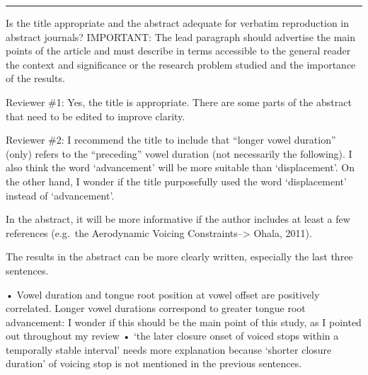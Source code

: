 \documentclass[]{article}
\begin{document}
\rule{\textwidth}{0.4pt}

Is the title appropriate and the abstract adequate for verbatim
reproduction in abstract journals? IMPORTANT: The lead paragraph should
advertise the main points of the article and must describe in terms
accessible to the general reader the context and significance or the
research problem studied and the importance of the results.

Reviewer \#1: Yes, the title is appropriate. There are some parts of the
abstract that need to be edited to improve clarity.

Reviewer \#2: I recommend the title to include that ``longer vowel
duration'' (only) refers to the ``preceding'' vowel duration (not
necessarily the following). I also think the word `advancement' will be
more suitable than `displacement'. On the other hand, I wonder if the
title purposefully used the word `displacement' instead of
`advancement'.

In the abstract, it will be more informative if the author includes at
least a few references (e.g.~the Aerodynamic Voicing
Constraints--\textgreater{} Ohala, 2011).

The results in the abstract can be more clearly written, especially the
last three sentences.

• Vowel duration and tongue root position at vowel offset are positively
correlated. Longer vowel durations correspond to greater tongue root
advancement: I wonder if this should be the main point of this study, as
I pointed out throughout my review • `the later closure onset of voiced
stops within a temporally stable interval' needs more explanation
because `shorter closure duration' of voicing stop is not mentioned in
the previous sentences.
\end{document}
